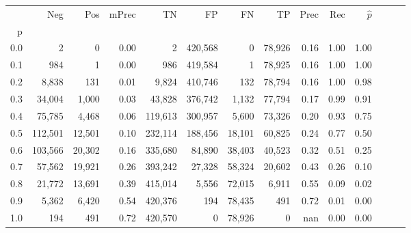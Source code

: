 \begin{tabular}{rrrrrrrrrrrrrr}
\toprule
{} &      Neg &     Pos & mPrec &       TN &       FP &      FN &      TP &  Prec &   Rec & $\hat{p}$ \\
p   &          &         &       &          &          &         &         &       &       &           \\
\midrule
0.0 &        2 &       0 &  0.00 &        2 &  420,568 &       0 &  78,926 &  0.16 &  1.00 &      1.00 \\
0.1 &      984 &       1 &  0.00 &      986 &  419,584 &       1 &  78,925 &  0.16 &  1.00 &      1.00 \\
0.2 &    8,838 &     131 &  0.01 &    9,824 &  410,746 &     132 &  78,794 &  0.16 &  1.00 &      0.98 \\
0.3 &   34,004 &   1,000 &  0.03 &   43,828 &  376,742 &   1,132 &  77,794 &  0.17 &  0.99 &      0.91 \\
0.4 &   75,785 &   4,468 &  0.06 &  119,613 &  300,957 &   5,600 &  73,326 &  0.20 &  0.93 &      0.75 \\
0.5 &  112,501 &  12,501 &  0.10 &  232,114 &  188,456 &  18,101 &  60,825 &  0.24 &  0.77 &      0.50 \\
0.6 &  103,566 &  20,302 &  0.16 &  335,680 &   84,890 &  38,403 &  40,523 &  0.32 &  0.51 &      0.25 \\
0.7 &   57,562 &  19,921 &  0.26 &  393,242 &   27,328 &  58,324 &  20,602 &  0.43 &  0.26 &      0.10 \\
0.8 &   21,772 &  13,691 &  0.39 &  415,014 &    5,556 &  72,015 &   6,911 &  0.55 &  0.09 &      0.02 \\
0.9 &    5,362 &   6,420 &  0.54 &  420,376 &      194 &  78,435 &     491 &  0.72 &  0.01 &      0.00 \\
1.0 &      194 &     491 &  0.72 &  420,570 &        0 &  78,926 &       0 &   nan &  0.00 &      0.00 \\
\bottomrule
\end{tabular}
